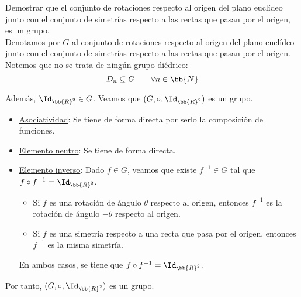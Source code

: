 \begin{ejercicio}\label{ej:2.12}
    Demostrar que el conjunto de rotaciones respecto al origen del plano euclídeo junto con el conjunto de simetrías respecto a las rectas que pasan por el origen, es un grupo.\\

    Denotamos por $G$ al conjunto de rotaciones respecto al origen del plano euclídeo junto con el conjunto de simetrías respecto a las rectas que pasan por el origen. Notemos que no se trata de ningún grupo diédrico:
    \begin{equation*}
        D_n\subsetneq G\qquad \forall n\in\bb{N}
    \end{equation*}

    Además, $\Id_{\bb{R}^2}\in G$. Veamos que $(G,\circ, \Id_{\bb{R}^2})$ es un grupo.
    \begin{itemize}
        \item \ul{Asociatividad}: Se tiene de forma directa por serlo la composición de funciones.

        \item \ul{Elemento neutro}: Se tiene de forma directa.

        \item \ul{Elemento inverso}: Dado $f\in G$, veamos que existe $f^{-1}\in G$ tal que $f\circ f^{-1} = \Id_{\bb{R}^2}$.
        \begin{itemize}
            \item Si $f$ es una rotación de ángulo $\theta$ respecto al origen, entonces $f^{-1}$ es la rotación de ángulo $-\theta$ respecto al origen.
            \item Si $f$ es una simetría respecto a una recta que pasa por el origen, entonces $f^{-1}$ es la misma simetría.
        \end{itemize}
        En ambos casos, se tiene que $f\circ f^{-1} = \Id_{\bb{R}^2}$.
    \end{itemize}

    Por tanto, $(G,\circ, \Id_{\bb{R}^2})$ es un grupo.
\end{ejercicio}

